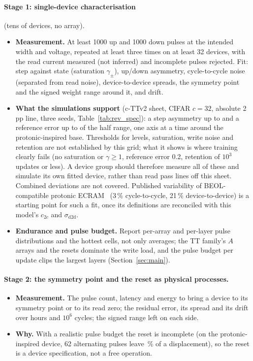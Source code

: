 \paragraph{Stage 1: single-device characterisation} (tens of devices, no array).
\begin{itemize}
\item \textbf{Measurement.} At least 1000 up and 1000 down pulses at the intended width and voltage, repeated at least three
      times on at least 32 devices, with the read current measured (not inferred) and incomplete pulses rejected. Fit: step
      against state (saturation $\gamma_\pm$), up/down asymmetry, cycle-to-cycle noise (separated from read noise),
      device-to-device spreads, the symmetry point and the signed weight range around it, and drift.
\item \textbf{What the simulations support} (c-TTv2 sheet, CIFAR $c=32$, absolute 2\,pp line, three seeds,
      Table~\ref{tab:rev_spec}): a step asymmetry up to \RVSpecCttvTwoCifarAsymThr{} and a reference error up to
      \RVSpecCttvTwoCifarRefErrThr{} of the half range, one axis at a time around the protonic-inspired base. Thresholds for
      levels, saturation, write noise and retention are not established by this grid; what it shows is where training clearly
      fails (no saturation or $\gamma\ge1$, reference error 0.2, retention of $10^3$ updates or less). A device group should
      therefore measure all of these and simulate its own fitted device, rather than read pass lines off this sheet. Combined deviations are not covered. Published variability of BEOL-compatible protonic ECRAM~\cite{xu2026}
      (3\,\% cycle-to-cycle, 21\,\% device-to-device) is a starting point for such a fit, once its definitions are reconciled
      with this model's $c_{2c}$ and $\sigma_{\mathrm{d2d}}$.
\item \textbf{Endurance and pulse budget.} Report per-array and per-layer pulse distributions and the hottest cells, not only
      averages; the TT family's $A$ arrays and the resets dominate the write load, and the pulse budget per update clips the
      largest layers (Section~\ref{sec:main}).
\end{itemize}

\paragraph{Stage 2: the symmetry point and the reset as physical processes.}
\begin{itemize}
\item \textbf{Measurement.} The pulse count, latency and energy to bring a device to its symmetry point or to its read zero; the
      residual error, its spread and its drift over hours and $10^6$ cycles; the signed range left on each side.
\item \textbf{Why.} With a realistic pulse budget the reset is incomplete (on the protonic-inspired device, 62 alternating
      pulses leave \RVresetResidPct\,\% of a displacement), so the reset is a device specification, not a free operation.
\end{itemize}

